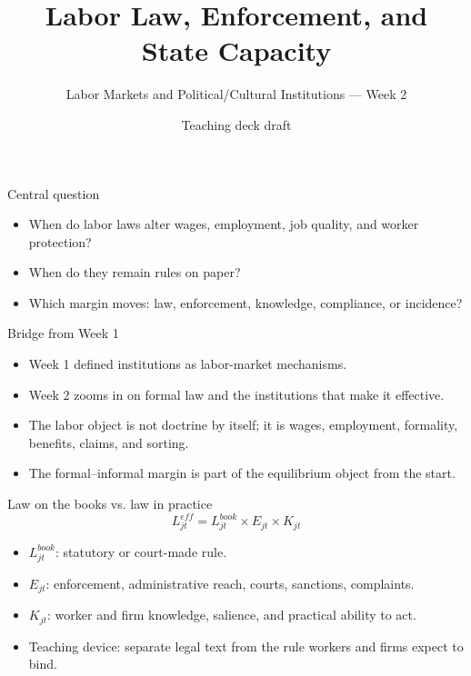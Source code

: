 \documentclass[aspectratio=169,11pt]{beamer}
\title{Labor Law, Enforcement, and State Capacity}
\subtitle{Labor Markets and Political/Cultural Institutions --- Week 2}
\author{Teaching deck draft}
\date{}
\begin{document}
\begin{frame}
  \titlepage
\end{frame}

\begin{frame}{Central question}
\begin{itemize}
    \item When do labor laws alter wages, employment, job quality, and worker protection?
    \item When do they remain rules on paper?
    \item Which margin moves: law, enforcement, knowledge, compliance, or incidence?
\end{itemize}
\end{frame}

\begin{frame}{Bridge from Week 1}
\begin{itemize}
    \item Week 1 defined institutions as labor-market mechanisms.
    \item Week 2 zooms in on formal law and the institutions that make it effective.
    \item The labor object is not doctrine by itself; it is wages, employment, formality, benefits, claims, and sorting.
    \item The formal--informal margin is part of the equilibrium object from the start.
\end{itemize}
\end{frame}

\begin{frame}{Law on the books vs. law in practice}
\[
L^{eff}_{jt}=L^{book}_{jt}\times E_{jt}\times K_{jt}
\]
\begin{itemize}
    \item $L^{book}_{jt}$: statutory or court-made rule.
    \item $E_{jt}$: enforcement, administrative reach, courts, sanctions, complaints.
    \item $K_{jt}$: worker and firm knowledge, salience, and practical ability to act.
    \item Teaching device: separate legal text from the rule workers and firms expect to bind.
\end{itemize}
\end{frame}
\end{document}
